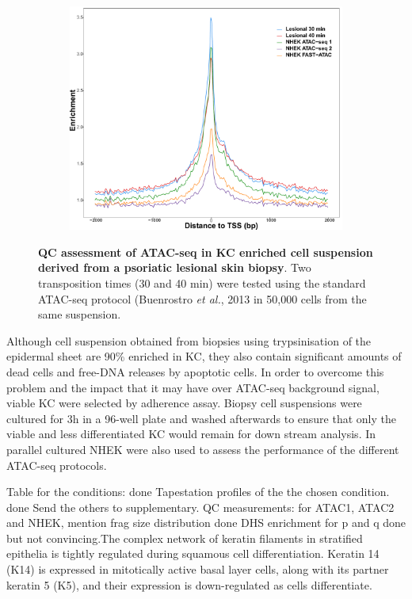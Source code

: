 \begin{figure}[htbp]
\begin{subfigure}{0.45\textwidth}
\includegraphics[width=\textwidth]{./Results1/pdfs/ATAC_skin_TSS_enrichment_PS02_30_40min_NHEK_ATAC1_ATAC_2_FAST_ATAC}
\caption{\textbf{}} %
\end{subfigure}
\caption[QC assessment of ATAC-seq in KC enriched cell suspension derived from a psoriatic lesional skin biopsy]{\textbf{QC assessment of ATAC-seq in KC enriched cell suspension derived from a psoriatic lesional skin biopsy}. Two transposition times (30 and 40 min) were tested using the standard ATAC-seq protocol (Buenrostro \textit{et al.}, 2013 in 50,000 cells from the same suspension.}
\label{fig:PS02_skin_ATAC_QC_assessment}
\end{figure} 




Although cell suspension obtained from biopsies using trypsinisation of the epidermal sheet are 90\% enriched in KC, they also contain significant amounts of dead cells and free-DNA releases by apoptotic cells. In order to overcome this problem and the impact that it may have over ATAC-seq background signal, viable KC were selected by adherence assay. Biopsy cell suspensions were cultured for 3h in a 96-well plate and washed afterwards to ensure that only the viable and less differentiated KC would remain for down stream analysis. In parallel cultured NHEK were also used to assess the performance of the different ATAC-seq protocols.

Table for the conditions: done
Tapestation profiles of the the chosen condition. done Send the others to supplementary.
QC measurements: for ATAC1, ATAC2 and NHEK, mention frag size distribution done
DHS enrichment for p and q done but not convincing.The complex network of keratin filaments in stratified epithelia is tightly regulated during squamous cell differentiation. Keratin 14 (K14) is expressed in mitotically active basal layer cells, along with its partner keratin 5 (K5), and their expression is down-regulated as cells differentiate.


